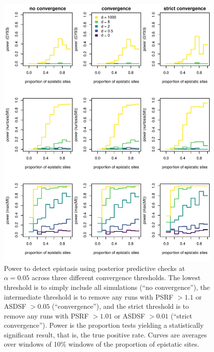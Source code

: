 \documentclass[11pt]{article}
\begin{document}
\begin{figure}
  \centering
  \includegraphics[width=\textwidth]{figures/power_curves_sensitivity.pdf}
  \caption{
  Power to detect epistasis using posterior predictive checks at $\alpha = 0.05$ across three different convergence thresholds.
  The lowest threshold is to simply include all simulations (``no convergence''), the intermediate threshold is to remove any runs with PSRF $> 1.1$ or ASDSF $> 0.05$ (``convergence''), and the strict threshold is to remove any runs with PSRF $> 1.01$ or ASDSF $> 0.01$ (``strict convergence'').
  Power is the proportion tests yielding a statistically significant result, that is, the true positive rate.
  Curves are averages over windows of 10\% windows of the proportion of epistatic sites.
  }
  \label{fig:power_curves_sensitivity}
\end{figure}
\end{document}
